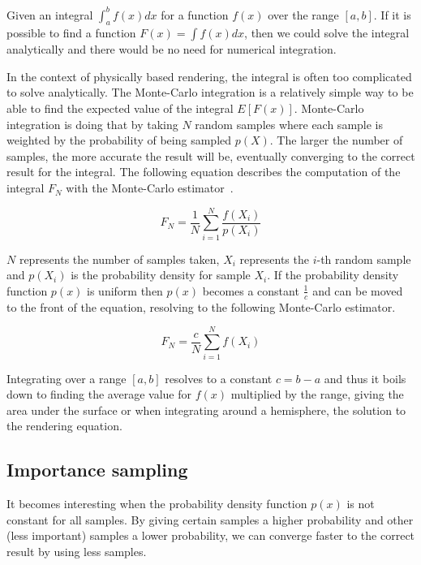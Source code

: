 \documentclass[11pt,a4paper]{report}
\begin{document}
Given an integral $\int_a^b f(x) dx$ for a function $f(x)$ over the range $[a, b]$. If it is possible to find a function $F(x) = \int f(x) dx$, then we could solve the integral analytically and there would be no need for numerical integration.

In the context of physically based rendering, the integral is often too complicated to solve analytically. The Monte-Carlo integration is a relatively simple way to be able to find the expected value of the integral $E[F(x)]$. Monte-Carlo integration is doing that by taking $N$ random samples where each sample is weighted by the probability of being sampled $p(X)$. The larger the number of samples, the more accurate the result will be, eventually converging to the correct result for the integral. The following equation describes the computation of the integral $F_N$ with the Monte-Carlo estimator~\cite{pharr2017}.

\begin{equation}
F_N = \frac{1}{N} \sum_{i=1}^{N} \frac{f(X_i)}{p(X_i)}
\end{equation}

$N$ represents the number of samples taken, $X_i$ represents the $i$-th random sample and $p(X_i)$ is the probability density for sample $X_i$. If the probability density function $p(x)$ is uniform then $p(x)$ becomes a constant $\frac{1}{c}$ and can be moved to the front of the equation, resolving to the following Monte-Carlo estimator.

\begin{equation}
F_N = \frac{c}{N} \sum_{i=1}^{N} f(X_i)
\end{equation}

Integrating over a range $[a , b]$ resolves to a constant $c = b - a$ and thus it boils down to finding the average value for $f(x)$ multiplied by the range, giving the area under the surface or when integrating around a hemisphere, the solution to the rendering equation.

\subsection{Importance sampling}
\label{section_importance_sampling}

It becomes interesting when the probability density function $p(x)$ is not constant for all samples. By giving certain samples a higher probability and other (less important) samples a lower probability, we can converge faster to the correct result by using less samples.
\end{document}
